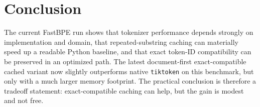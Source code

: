 \documentclass[11pt]{article}
\begin{document}
\section{Conclusion}
The current FastBPE run shows that tokenizer performance depends strongly on implementation and domain, that repeated-substring caching can materially speed up a readable Python baseline, and that exact token-ID compatibility can be preserved in an optimized path. The latest document-first exact-compatible cached variant now slightly outperforms native \texttt{tiktoken} on this benchmark, but only with a much larger memory footprint. The practical conclusion is therefore a tradeoff statement: exact-compatible caching can help, but the gain is modest and not free.
\end{document}
